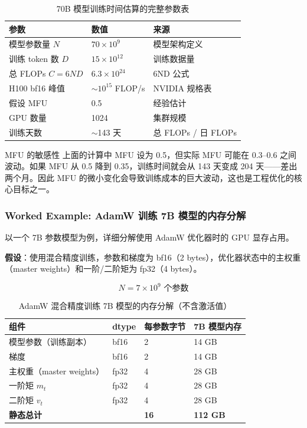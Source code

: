\begin{table}[H]
\centering
\begin{tabular}{p{}p{}p{}}
\toprule
\textbf{参数} & \textbf{数值} & \textbf{来源} \\
\midrule
模型参数量 $N$ & $70 \times 10^9$ & 模型架构定义 \\
训练 token 数 $D$ & $15 \times 10^{12}$ & 训练数据量 \\
总 FLOPs $C = 6ND$ & $6.3 \times 10^{24}$ & 6ND 公式 \\
H100 bf16 峰值 & $\sim 10^{15}$ FLOP/s & NVIDIA 规格表 \\
假设 MFU & 0.5 & 经验估计 \\
GPU 数量 & 1024 & 集群规模 \\
训练天数 & $\sim$143 天 & 总 FLOPs / 日 FLOPs \\
\bottomrule
\end{tabular}
\caption{70B 模型训练时间估算的完整参数表}
\end{table}

\begin{warningbox}{MFU 的敏感性}
上面的计算中 MFU 设为 0.5，但实际 MFU 可能在 0.3--0.6 之间波动。如果 MFU 从 0.5 降到 0.35，训练时间就会从 143 天变成 204 天——差出两个月。因此 MFU 的微小变化会导致训练成本的巨大波动，这也是工程优化的核心目标之一。
\end{warningbox}

\subsubsection{Worked Example: AdamW 训练 7B 模型的内存分解}

以一个 7B 参数模型为例，详细分解使用 AdamW 优化器时的 GPU 显存占用。

\textbf{假设}：使用混合精度训练，参数和梯度为 bf16（2 bytes），优化器状态中的主权重（master weights）和一阶/二阶矩为 fp32（4 bytes）。

$$
N = 7 \times 10^9 \text{ 个参数}
$$

\begin{table}[H]
\centering
\begin{tabular}{p{}p{}p{}p{}}
\toprule
\textbf{组件} & \textbf{dtype} & \textbf{每参数字节} & \textbf{7B 模型内存} \\
\midrule
模型参数（训练副本） & bf16 & 2 & 14 GB \\
梯度 & bf16 & 2 & 14 GB \\
主权重（master weights） & fp32 & 4 & 28 GB \\
一阶矩 $m_t$ & fp32 & 4 & 28 GB \\
二阶矩 $v_t$ & fp32 & 4 & 28 GB \\
\midrule
\textbf{静态总计} & & \textbf{16} & \textbf{112 GB} \\
\bottomrule
\end{tabular}
\caption{AdamW 混合精度训练 7B 模型的内存分解（不含激活值）}
\end{table}

